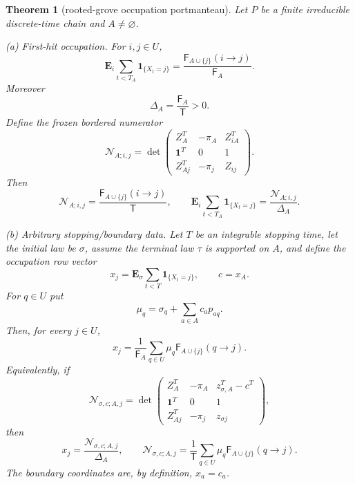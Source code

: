 \documentclass[11pt]{article}
\newtheorem{theorem}{Theorem}
\newcommand{\E}{\mathbf E}
\newcommand{\one}{\mathbf 1}
\newcommand{\cF}{\mathsf F}
\newcommand{\cT}{\mathsf T}
\begin{document}
\begin{theorem}[rooted-grove occupation portmanteau]
\label{thm:port}
Let $P$ be a finite irreducible discrete-time chain and $A\ne\varnothing$.

\emph{(a) First-hit occupation.} For $i,j\in U$,
\begin{equation}
\E_i\sum_{t<T_A}\mathbf 1_{\{X_t=j\}}
=
\frac{\cF_{A\cup\{j\}}(i\to j)}{\cF_A}.
\tag{3.1}
\end{equation}
Moreover
\begin{equation}
\boxed{\Delta_A=\frac{\cF_A}{\cT}>0.}
\tag{3.2}
\end{equation}
Define the frozen bordered numerator
\begin{equation}
\mathcal N_{A;i,j}
=
\det\begin{pmatrix}
Z_A^T&-\pi_A&Z_{iA}^T\\
\one^T&0&1\\
Z_{Aj}^T&-\pi_j&Z_{ij}
\end{pmatrix}.
\tag{3.3}
\end{equation}
Then
\begin{equation}
\boxed{\mathcal N_{A;i,j}=\frac{\cF_{A\cup\{j\}}(i\to j)}{\cT}},
\qquad
\boxed{\E_i\sum_{t<T_A}\mathbf 1_{\{X_t=j\}}=\frac{\mathcal N_{A;i,j}}{\Delta_A}}.
\tag{3.4}
\end{equation}

\emph{(b) Arbitrary stopping/boundary data.} Let $T$ be an integrable stopping time, let the initial law be $\sigma$, assume the terminal law $\tau$ is supported on $A$, and define the occupation row vector
\[
x_j=\E_\sigma\sum_{t<T}\mathbf 1_{\{X_t=j\}},
\qquad c=x_A.
\]
For $q\in U$ put
\begin{equation}
\mu_q=\sigma_q+\sum_{a\in A}c_a p_{aq}.
\tag{3.5}
\end{equation}
Then, for every $j\in U$,
\begin{equation}
\boxed{
x_j=\frac1{\cF_A}\sum_{q\in U}\mu_q\cF_{A\cup\{j\}}(q\to j).
}
\tag{3.6}
\end{equation}
Equivalently, if
\begin{equation}
\mathcal N_{\sigma,c;A,j}
=
\det\begin{pmatrix}
Z_A^T&-\pi_A&z_{\sigma,A}^T-c^T\\
\one^T&0&1\\
Z_{Aj}^T&-\pi_j&z_{\sigma j}
\end{pmatrix},
\tag{3.7}
\end{equation}
then
\begin{equation}
\boxed{x_j=\frac{\mathcal N_{\sigma,c;A,j}}{\Delta_A}},
\qquad
\boxed{\mathcal N_{\sigma,c;A,j}
=\frac1{\cT}\sum_{q\in U}\mu_q\cF_{A\cup\{j\}}(q\to j)}.
\tag{3.8}
\end{equation}
The boundary coordinates are, by definition, $x_a=c_a$.
\end{theorem}
\end{document}
